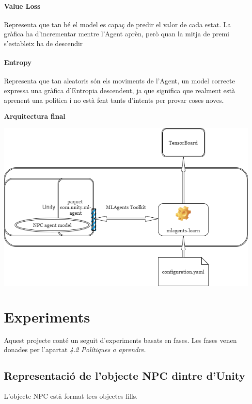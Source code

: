 \documentclass{article}
\begin{document}
        
    \paragraph{Value Loss}
    Representa que tan bé el model es capaç de predir el valor de cada estat. La gràfica ha d'incrementar mentre l'Agent aprèn, però quan la mitja de premi s'estableix ha de descendir
    
    \paragraph{Entropy}
    Representa que tan aleatoris són els moviments de l'Agent, un model correcte expressa una gràfica d'Entropia descendent, ja que significa que realment està aprenent una política i no està fent tants d'intents per provar coses noves.
    
    \textbf{Arquitectura final}
    
    \includegraphics[width=\textwidth]{images/arquitectura-tools.drawio.png} 
    
    \newpage
    
    \section{Experiments}
    
    Aquest projecte conté un seguit d'experiments basats en fases.
    Les fases venen donades per l'apartat \textit{4.2 Polítiques a aprendre}.
    
    \subsection{ Representació de l'objecte NPC dintre d'Unity }
    L'objecte NPC està format tres objectes fills.
    
\end{document}
